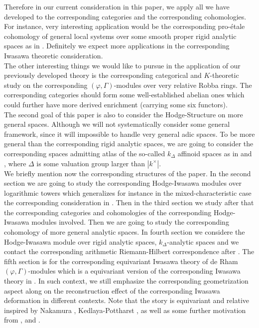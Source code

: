 \documentclass[12pt]{amsart}
\theoremstyle{definition}
\numberwithin{equation}{section}
\begin{document}
\indent Therefore in our current consideration in this paper, we apply all we have developed to the corresponding categories and the corresponding cohomologies. For instance, very interesting application would be the corresponding pro-\'etale cohomology of general local systems over some smooth proper rigid analytic spaces as in \cite{KL3}. Definitely we expect more applications in the corresponding Iwasawa theoretic consideration. \\


\indent The other interesting things we would like to pursue in the application of our previously developed theory is the corresponding categorical and $K$-theoretic study on the corresponding $(\varphi,\Gamma)$-modules over very relative Robba rings. The corresponding categories should form some well-established abelian ones which could further have more derived enrichment (carrying some six functors).\\


\indent The second goal of this paper is also to consider the Hodge-Structure on more general spaces. Although we will not systematically consider some general framework, since it will impossible to handle very general adic spaces. To be more general than the corresponding rigid analytic spaces, we are going to consider the corresponding spaces admitting atlas of the so-called $k_\Delta$ affinoid spaces as in \cite{TC} and \cite{DFN}, where $\Delta$ is some valuation group larger than $|k^\times|$.\\




\indent We briefly mention now the corresponding structures of the paper. In the second section we are going to study the corresponding Hodge-Iwasawa modules over logarithmic towers which generalizes for instance in the mixed-characteristic case the corresponding consideration in \cite[Chapter 7]{KL16}. Then in the third section we study after that the corresponding categories and cohomologies of the corresponding Hodge-Iwasawa modules involved. Then we are going to study the corresponding cohomology of more general analytic spaces. In fourth section we considere the Hodge-Iwasawa module over rigid analytic spaces, $k_\Delta$-analytic spaces and we contact the corresponding arithmetic Riemann-Hilbert correspondence after \cite{LZ}. The fifth section is for the corresponding equivariant Iwasawa theory of de Rham $(\varphi,\Gamma)$-modules which is a equivariant version of the corresponding Iwasawa theory in \cite{Nakamura1}. In such context, we still emphasize the corresponding geometrization aspect along \cite{KP} on the reconstruction effect of the corresponding Iwasawa deformation in different contexts. Note that the story is equivariant and relative inspired by Nakamura \cite{Nakamura3}, Kedlaya-Pottharst \cite{KP}, as well as some further motivation from \cite{BF1},\cite{BF2} and \cite{FK}.\\
\end{document}
